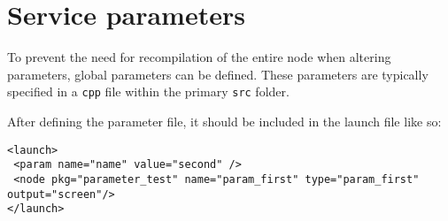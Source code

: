\section{Service parameters}

To prevent the need for recompilation of the entire node when altering parameters, global parameters can be defined. 
These parameters are typically specified in a \texttt{cpp} file within the primary \texttt{src} folder. 

After defining the parameter file, it should be included in the launch file like so:
\begin{verbatim}
<launch>
 <param name="name" value="second" />
 <node pkg="parameter_test" name="param_first" type="param_first" output="screen"/>
</launch>
\end{verbatim}